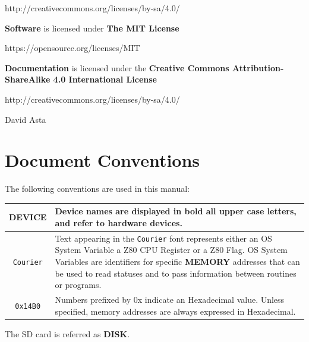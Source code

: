 \documentclass[a4paper,11pt]{article}
\begin{document}
    \hspace{1cm}http://creativecommons.org/licenses/by-sa/4.0/
    
    \textbf{Software} is licensed under \textbf{The MIT License}
    
    \hspace{1cm}https://opensource.org/licenses/MIT
    
    \textbf{Documentation} is licensed under the \textbf{Creative Commons
    Attribution-ShareAlike 4.0 International License}
    
    \hspace{1cm}http://creativecommons.org/licenses/by-sa/4.0/

    \normalsize

    \hrulefill

     David Asta

    \pagebreak
    \section*{Document Conventions}
    The following conventions are used in this manual:

    \begin{center}
        \begin{tabular}{c m{9cm}}
            \hline
            \textbf{DEVICE} & Device names are displayed in bold all upper case 
            letters, and refer to hardware devices.\\
            \hline
            \texttt{Courier} & Text appearing in the \texttt{Courier} font 
            represents either an OS System Variable a Z80 CPU Register
            or a Z80 Flag. OS System Variables are identifiers for specific
            \textbf{MEMORY} addresses that can be used to read statuses and to
            pass information between routines or programs.\\
            \hline
            \texttt{0x14B0} & Numbers prefixed by 0x indicate an Hexadecimal value.
            Unless specified, memory addresses are always expressed in
            Hexadecimal.\\
            \hline
        \end{tabular}
    \end{center}

    The SD card is referred as \textbf{DISK}.
\end{document}
